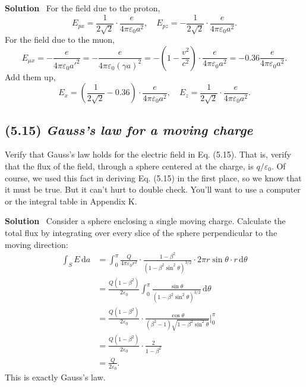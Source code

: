 \documentclass[hidelinks]{article}
\begin{document}
\vspace{5mm}
\noindent
\textbf{Solution} \, For the field due to the proton,
$$E_{px} = \frac{1}{2\sqrt{2}} \cdot  \frac{e}{4\pi \varepsilon_0 a^2}, \quad E_{pz} = -\frac{1}{2\sqrt{2}} \cdot \frac{e}{4\pi \varepsilon_0 a^2}.$$
For the field due to the muon,
$$E_{\mu x} = -\frac{e}{4\pi \varepsilon_0 a'^2} = -\frac{e}{4\pi \varepsilon_0 \left(\gamma a\right)^2} = -\left(1-\frac{v^2}{c^2}\right) \cdot \frac{e}{4\pi \varepsilon_0 a^2} = -0.36 \frac{e}{4\pi \varepsilon_0 a^2}.$$
Add them up,
$$E_x = \left(\frac{1}{2\sqrt{2}}-0.36\right) \cdot \frac{e}{4\pi \varepsilon_0 a^2}, \quad E_z = \frac{1}{2\sqrt{2}} \cdot \frac{e}{4\pi \varepsilon_0 a^2}.$$

\subsection{(5.15) \textit{Gauss’s law for a moving charge}}
Verify that Gauss’s law holds for the electric field in Eq. (5.15). That is, verify that the flux of the field, through a sphere centered at the charge, is $q/\varepsilon_0$. Of course, we used this fact in deriving Eq. (5.15) in the first place, so we know that it must be true. But it can’t hurt to double check. You’ll want to use a computer or the integral table in Appendix K.

\vspace{5mm}
\noindent
\textbf{Solution} \, Consider a sphere enclosing a single moving charge. Calculate the total flux by integrating over every slice of the sphere perpendicular to the moving direction:
\begin{align}
   \int_S E \, \mathrm{d}a &= \int_0^\pi \frac{Q}{4\pi \varepsilon_0 r^2} \cdot \frac{1-\beta^2}{(1-\beta^2 \sin ^2 \theta)^{3/2}} \cdot 2\pi r \sin \theta \cdot r\, \mathrm{d}\theta \\
   &=\frac{Q(1-\beta^2)}{2\varepsilon_0} \int_0^\pi \frac{\sin \theta}{(1-\beta^2 \sin^2 \theta)^{3/2}}\, \mathrm{d}\theta \\ 
   & = \frac{Q(1-\beta^2)}{2\varepsilon_0} \cdot \frac{\cos \theta}{(\beta^2-1)\sqrt{1-\beta^2 \sin ^2 \theta}} \Bigg|_0^\pi \\
   & = \frac{Q(1-\beta^2)}{2\varepsilon_0} \cdot \frac{2}{1-\beta^2}\\
   & = \frac{Q}{2\varepsilon_0}.
\end{align}
This is exactly Gauss's law.
\end{document}
